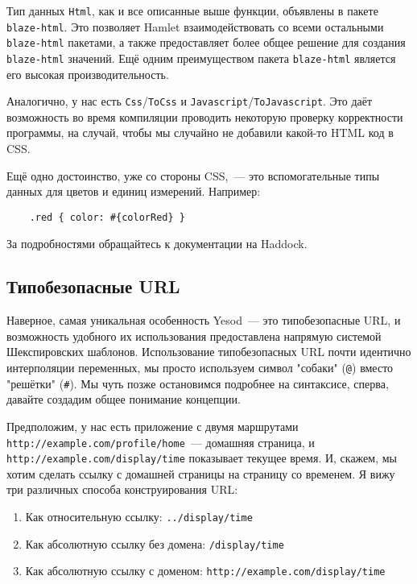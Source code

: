 \begin{remark}
    Тип данных \lstinline'Html', как и все описанные выше функции, объявлены в
    пакете \texttt{blaze-html}. Это позволяет Hamlet взаимодействовать
    со всеми остальными \texttt{blaze-html} пакетами, а также предоставляет
    более общее решение для создания \texttt{blaze-html} значений.  Ещё одним
    преимуществом пакета \texttt{blaze-html} является его высокая
    производительность.
\end{remark}

Аналогично, у нас есть \lstinline'Css'/\lstinline'ToCss' и
\lstinline'Javascript'/\lstinline'ToJavascript'. Это даёт возможность во время
компиляции проводить некоторую проверку корректности программы, на случай,
чтобы  мы случайно не добавили какой-то HTML код в CSS.

\begin{remark}
    Ещё одно достоинство, уже со стороны CSS,~--- это вспомогательные
    типы данных для цветов и единиц измерений. Например:

    \begin{lstlisting}
    .red { color: #{colorRed} }
    \end{lstlisting}

    За подробностями обращайтесь к документации на Haddock.
\end{remark}

\subsection{Типобезопасные URL}
Наверное, самая уникальная особенность Yesod~--- это типобезопасные URL, и
возможность удобного их использования предоставлена напрямую системой
Шекспировских шаблонов.  Использование типобезопасных URL почти идентично
интерполяции переменных, мы просто используем символ "собаки" (\lstinline'@')
вместо "решётки" (\lstinline'#').  Мы чуть позже остановимся подробнее на
синтаксисе, сперва, давайте создадим общее понимание концепции.

Предположим, у нас есть приложение с двумя маршрутами
\texttt{http://example.com/profile/home}~--- домашняя страница, и
\texttt{http://example.com/display/time} показывает текущее время.  И, скажем,
мы хотим сделать ссылку с домашней страницы на страницу со временем.  Я вижу
три различных способа конструирования URL:
\begin{enumerate}
  \item Как относительную ссылку: \texttt{../display/time}
  \item Как абсолютную ссылку без домена: \texttt{/display/time}
  \item Как абсолютную ссылку с доменом: \texttt{http://example.com/display/time}
\end{enumerate}


